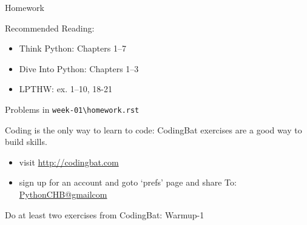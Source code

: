 \documentclass{beamer}
\begin{document}
\begin{frame}[fragile]{Homework}

Recommended Reading:
\begin{itemize}
  \item Think Python: Chapters 1--7 \\
  \item Dive Into Python: Chapters 1--3 \\
  \item LPTHW: ex. 1--10, 18-21 \\
\end{itemize}

\vfill
Problems in \verb|week-01\homework.rst|

\vfill
Coding is the only way to learn to code: 
CodingBat exercises are a good way to build skills.
\begin{itemize}
  \item visit \url{http://codingbat.com}
  \item sign up for an account and goto ‘prefs’ page and share To: \url{PythonCHB@gmailcom}
\end{itemize}

Do at least two exercises from CodingBat: Warmup-1 

\end{frame}
\end{document}
